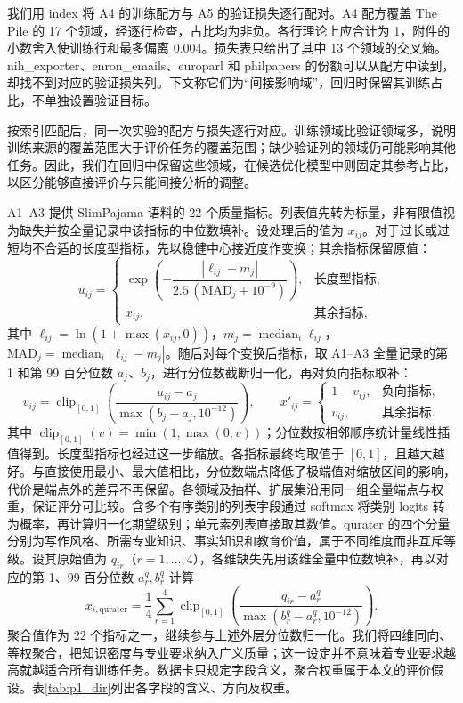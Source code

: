 我们用 index 将 A4 的训练配方与 A5 的验证损失逐行配对。A4 配方覆盖 The Pile\cite{gao2020pile} 的 17 个领域，经逐行检查，占比均为非负。各行理论上应合计为 1，附件的小数舍入使训练行和最多偏离 0.004。损失表只给出了其中 13 个领域的交叉熵。nih\_\allowbreak{}exporter、enron\_\allowbreak{}emails、europarl 和 philpapers 的份额可以从配方中读到，却找不到对应的验证损失列。下文称它们为“间接影响域”，回归时保留其训练占比，不单独设置验证目标。

按索引匹配后，同一次实验的配方与损失逐行对应。训练领域比验证领域多，说明训练来源的覆盖范围大于评价任务的覆盖范围；缺少验证列的领域仍可能影响其他任务。因此，我们在回归中保留这些领域，在候选优化模型中则固定其参考占比，以区分能够直接评价与只能间接分析的调整。

A1--A3 提供 SlimPajama 语料的 22 个质量指标\cite{slimpajama2025}。列表值先转为标量，非有限值视为缺失并按全量记录中该指标的中位数填补。设处理后的值为 $x_{ij}$。对于过长或过短均不合适的长度型指标，先以稳健中心接近度作变换；其余指标保留原值：
\begin{equation}
    u_{ij} = \begin{cases}
        \exp\!\left(-\dfrac{|\ell_{ij}-m_j|}{2.5\,(\mathrm{MAD}_j+10^{-9})}\right), & \text{长度型指标},\\[6pt]
        x_{ij}, & \text{其余指标},
    \end{cases}
\end{equation}
其中 $\ell_{ij}=\ln(1+\max(x_{ij},0))$，$m_j=\operatorname{median}_i\ell_{ij}$，$\mathrm{MAD}_j=\operatorname{median}_i|\ell_{ij}-m_j|$。随后对每个变换后指标，取 A1--A3 全量记录的第 1 和第 99 百分位数 $a_j$、$b_j$，进行分位数截断归一化，再对负向指标取补：
\begin{equation}
    v_{ij}=\operatorname{clip}_{[0,1]}\!\left(\frac{u_{ij}-a_j}{\max(b_j-a_j,10^{-12})}\right),
    \qquad
    x'_{ij}=\begin{cases}1-v_{ij},&\text{负向指标},\\v_{ij},&\text{其余指标}.\end{cases}
\end{equation}
其中 $\operatorname{clip}_{[0,1]}(v)=\min(1,\max(0,v))$；分位数按相邻顺序统计量线性插值得到。长度型指标也经过这一步缩放。各指标最终均取值于 $[0,1]$，且越大越好。与直接使用最小、最大值相比，分位数端点降低了极端值对缩放区间的影响，代价是端点外的差异不再保留。各领域及抽样、扩展集沿用同一组全量端点与权重，保证评分可比较。含多个有序类别的列表字段通过 softmax 将类别 logits 转为概率，再计算归一化期望级别；单元素列表直接取其数值。qurater 的四个分量分别为写作风格、所需专业知识、事实知识和教育价值，属于不同维度而非互斥等级\cite{slimpajama2025}。设其原始值为 $q_{ir}$（$r=1,\ldots,4$），各维缺失先用该维全量中位数填补，再以对应的第 1、99 百分位数 $a_r^q,b_r^q$ 计算
\begin{equation}
 x_{i,\mathrm{qurater}}=\frac14\sum_{r=1}^{4}
 \operatorname{clip}_{[0,1]}\!\left(\frac{q_{ir}-a_r^q}{\max(b_r^q-a_r^q,10^{-12})}\right).
\end{equation}
聚合值作为 22 个指标之一，继续参与上述外层分位数归一化。我们将四维同向、等权聚合，把知识密度与专业要求纳入广义质量；这一设定并不意味着专业要求越高就越适合所有训练任务。数据卡只规定字段含义，聚合权重属于本文的评价假设。表\ref{tab:p1_dir}列出各字段的含义、方向及权重。

